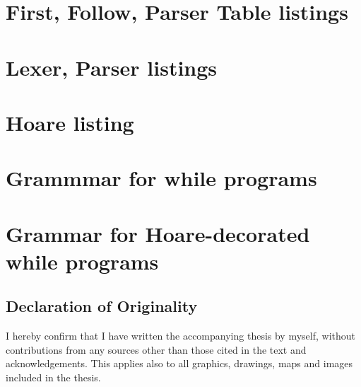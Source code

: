 \cite{gate_compiler_design}


\nocite{*}


\appendix

\chapter{First, Follow, Parser Table listings}\label{app:parser_table}


\newpage

\newpage


\chapter{Lexer, Parser listings}\label{app:lexer_parser}




\chapter{Hoare listing}\label{app:lexer_parser}



\chapter{Grammmar for while programs}\label{app:grammar_core}



\chapter{Grammar for Hoare-decorated while programs}\label{app:grammar_hoare}



\clearpage
{}
\clearpage
{}

\section*{{\huge{}Declaration of Originality}}

I hereby confirm that I have written the accompanying thesis by myself, without contributions from any sources other than those cited in the text and acknowledgements.
This applies also to all graphics, drawings, maps and images included in the thesis.

